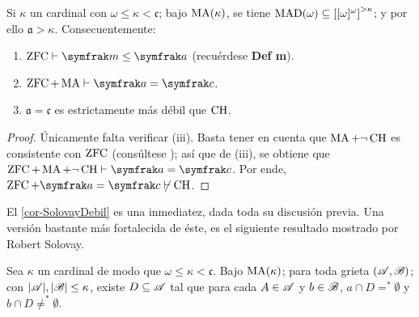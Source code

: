  \begin{corolario}\label{cor-MaSimple}
  Si $\kappa$ un cardinal con $\omega \leq \kappa <\mathfrak{c}$; bajo $\operatorname{MA}(\kappa)$, se tiene $\operatorname{MAD}(\omega) \subseteq \left[[\omega]^\omega\right]^{>\kappa}$; y por ello $\mathfrak{a}>\kappa$.
  Consecuentemente:
  \begin{enumerate}
   \item $\zfc \vdash \mathfrak{m} \leq \mathfrak{a}$ (recuérdese \textbf{Def m}).
   \item $\zfc + \Ma \vdash \mathfrak{a}=\mathfrak{c}$.
   \item $\mathfrak{a} = \mathfrak{c}$ es estrictamente más débil que $\operatorname{CH}$.
  \end{enumerate}
 \end{corolario}

 \begin{proof}
  Únicamente falta verificar (iii). Basta tener en cuenta que $\operatorname{MA} + \lnot \operatorname{CH}$ es consistente con $\operatorname{ZFC}$ (consúltese \cite[p.~279-281]{kunenSet}); así que de (iii), se obtiene que $\zfc + \Ma + \lnot \HC \vdash \mathfrak{a}=\mathfrak{c}$. Por ende, $\zfc + \mathfrak{a}=\mathfrak{c} \not\vdash \HC$.
 \end{proof}

 El \autoref{cor-SolovayDebil} es una inmediatez, dada toda su discusión previa. Una versión bastante más fortalecida de éste, es el siguiente resultado mostrado por Robert Solovay.

 \begin{lema}[Solovay]\label{lem-Solovay}
  Sea $\kappa$ un cardinal de modo que $\omega \leq \kappa < \mathfrak{c}$. Bajo $\operatorname{MA}(\kappa)$; para toda grieta $(\mathscr{A},\mathscr{B})$; con $|\mathscr{A}|,|\mathscr{B}|\leq \kappa$, existe $D\subseteq \mathscr{A}$ tal que para cada $A \in \mathscr{A}$ y $b \in \mathscr{B}$, $a \cap D=^*\emptyset$ y $b \cap D\neq ^*\emptyset$.
 \end{lema}

